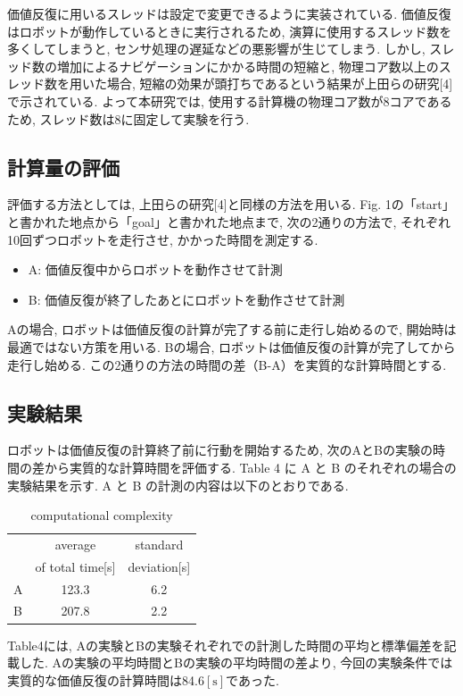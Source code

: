 \documentclass{jarticle}
\begin{document}
価値反復に用いるスレッドは設定で変更できるように実装されている. 価値反復はロボットが動作しているときに実行されるため, 
演算に使用するスレッド数を多くしてしまうと, センサ処理の遅延などの悪影響が生じてしまう. 
しかし, スレッド数の増加によるナビゲーションにかかる時間の短縮と, 
物理コア数以上のスレッド数を用いた場合, 短縮の効果が頭打ちであるという結果が上田らの研究[4]で示されている. 
よって本研究では, 使用する計算機の物理コア数が8コアであるため, スレッド数は8に固定して実験を行う.
\subsection{計算量の評価}
評価する方法としては, 上田らの研究[4]と同様の方法を用いる. 
Fig. 1の「start」と書かれた地点から「goal」と書かれた地点まで, 次の2通りの方法で, それぞれ10回ずつロボットを走行させ, かかった時間を測定する.

\begin{itemize}
	\item A: 価値反復中からロボットを動作させて計測
	\item B: 価値反復が終了したあとにロボットを動作させて計測
\end{itemize}

Aの場合, ロボットは価値反復の計算が完了する前に走行し始めるので, 開始時は最適ではない方策を用いる.
Bの場合, ロボットは価値反復の計算が完了してから走行し始める. 
この2通りの方法の時間の差（B-A）を実質的な計算時間とする.
\subsection{実験結果}
ロボットは価値反復の計算終了前に行動を開始するため, 次のAとBの実験の時間の差から実質的な計算時間を評価する. 
Table 4 に A と B のそれぞれの場合の実験結果を示す. 
A と B の計測の内容は以下のとおりである.

\begin{table}[hbtp]
	\caption{computational complexity}
	\centering
	 \begin{tabular}{l|cc}
		\hline
		 & average & standard \\
		 & of total time[s] & deviation[s] \\
		\hline \hline
		A & 123.3 & 6.2 \\
		B & 207.8 & 2.2 \\
		\hline
	 \end{tabular}
 \end{table}

Table4には, Aの実験とBの実験それぞれでの計測した時間の平均と標準偏差を記載した. 
Aの実験の平均時間とBの実験の平均時間の差より, 今回の実験条件では実質的な価値反復の計算時間は84.6$\mathrm{[s]}$であった.
\end{document}
